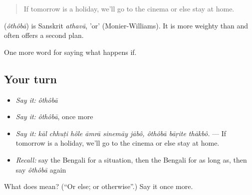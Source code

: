 \begin{quote}
If tomorrow is a holiday, we'll go to the cinema or else stay at home.
\end{quote}

\begin{cousinweb}
\textbf{} (\emph{ôthôbā}) is Sanskrit \emph{athavā}, 'or' (Monier-Williams). It is more weighty than  and often offers a second plan.
\end{cousinweb}

\begin{grammarlens}[title={What you've built}]
One more word for saying what happens if.
\end{grammarlens}

\subsection*{Your turn}
\begin{itemize}
\raggedright
  \item \emph{Say it:} \emph{ôthôbā}
  \item \emph{Say it:} \emph{ôthôbā}, once more
  \item \emph{Say it:} \emph{kāl chhuṭi hôle āmrā sinemāy jābô, ôthôbā bāṛite thākbô.} — If tomorrow is a holiday, we'll go to the cinema or else stay at home.
  \item \emph{Recall:} say the Bengali for a situation, then the Bengali for as long as, then say \emph{ôthôbā} again
\end{itemize}

\begin{tcolorbox}[breakable,colback=teal!4,colframe=teal!35!black,title={Before you move on}]
What does  mean? (\textquotedblleft{}Or else; or otherwise\textquotedblright{}.) Say it once more.
\end{tcolorbox}
